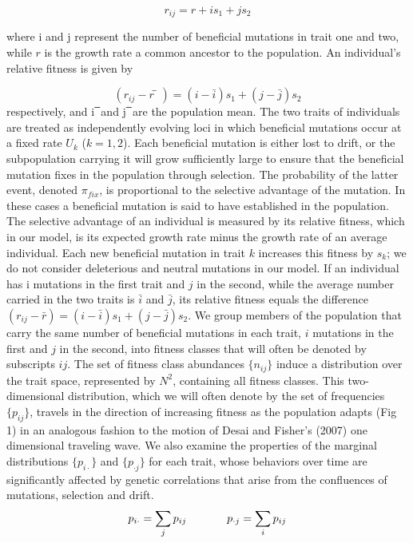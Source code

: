 \documentclass{article}
\begin{document}
\[ r_{ij}=r+i s_1+j s_2 \]

where i and j represent the number of beneficial mutations in trait one and two, while $r$ is the growth rate a common ancestor to the population. 
An individual’s relative fitness is given by

\[ (r_{ij}-r ̅)=(i-\bar{i} ) s_1+(j-\bar{j} ) s_2 \]
respectively, and i ̅ and j ̅ are the population mean.  The two traits of individuals are treated as independently evolving loci in which beneficial mutations occur at a fixed rate $U_k$ ($k=1,2$).  Each beneficial mutation is either lost to drift, or the subpopulation carrying it will grow sufficiently large to ensure that the beneficial mutation fixes in the population through selection. The probability of the latter event, denoted $\pi_{fix}$, is proportional to the selective advantage of the mutation. In these cases a beneficial mutation is said to have established in the population. The selective advantage of an individual is measured by its relative fitness, which in our model, is its expected growth rate minus the growth rate of an average individual. Each new beneficial mutation in trait $k$ increases this fitness by $s_k$; we do not consider deleterious and neutral mutations in our model. If an individual has i mutations in the first trait and $j$ in the second, while the average number carried in the two traits is $\bar{i}$ and $\bar{j}$, its relative fitness equals the difference $(r_{ij}-\bar{r})=(i-\bar{i}) s_1+(j-\bar{j}) s_2$. We group members of the population that carry the same number of beneficial mutations in each trait, $i$ mutations in the first and $j$ in the second, into fitness classes that will often be denoted by subscripts $ij$. The set of fitness class abundances $\{n_{ij} \}$ induce a distribution over the trait space, represented by $N^2$, containing all fitness classes. This two-dimensional distribution, which we will often denote by the set of frequencies $\{p_{ij}\}$, travels in the direction of increasing fitness as the population adapts (Fig 1) in an analogous fashion to the motion of Desai and Fisher’s (2007) one dimensional traveling wave. We also examine the properties of the marginal distributions $\{p_{i\cdot}\}$ and $\{p_{\cdot j}\}$ for each trait, whose behaviors over time are significantly affected by genetic correlations that arise from the confluences of mutations, selection and drift.
\begin{equation}
p_{i \cdot }= \sum_j p_{ij} \hspace{0.5in} p_{\cdot j}= \sum_i p_{ij}
\end{equation}
\end{document}
